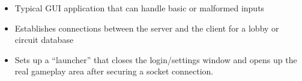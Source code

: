 
\begin{itemize}
\item Typical GUI application that can handle basic or malformed inputs
\item Establishes connections between the server and the client for a lobby or circuit database
\item Sets up a ``launcher'' that closes the login/settings window and opens up the real gameplay area after securing a socket connection.
\end{itemize}

